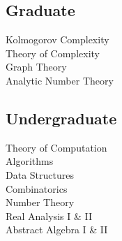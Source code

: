 \documentclass[]{jhearn-resume}
\begin{document}
\begin{minipage}[t]{0.34\textwidth}
\subsection{Graduate}
Kolmogorov Complexity \\
Theory of Complexity \\
Graph Theory \\
Analytic Number Theory
\sectionsep

\subsection{Undergraduate}
Theory of Computation \\
Algorithms \\
Data Structures \\
Combinatorics \\
Number Theory \\
Real Analysis I \& II \\
Abstract Algebra I \& II\\
\sectionsep

\end{minipage}
\end{document}
